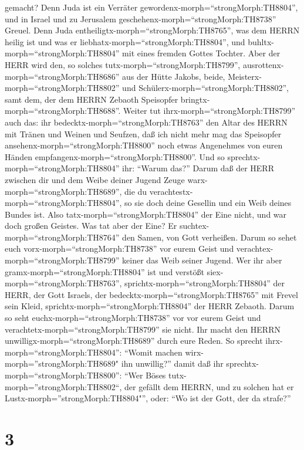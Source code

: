 gemacht?  Denn Juda ist ein Verräter
gewordenx-morph=``strongMorph:TH8804'', und in Israel und zu Jerusalem
geschehenx-morph=``strongMorph:TH8738'' Greuel. Denn Juda
entheiligtx-morph=``strongMorph:TH8765'', was dem HERRN heilig ist und
was er liebhatx-morph=``strongMorph:TH8804'', und
buhltx-morph=``strongMorph:TH8804'' mit eines fremden Gottes Tochter.
 Aber der HERR wird den, so solches
tutx-morph=``strongMorph:TH8799'',
ausrottenx-morph=``strongMorph:TH8686'' aus der Hütte Jakobs, beide,
Meisterx-morph=``strongMorph:TH8802'' und
Schülerx-morph=``strongMorph:TH8802'', samt dem, der dem HERRN Zebaoth
Speisopfer bringtx-morph=``strongMorph:TH8688''.  Weiter
tut ihrx-morph=``strongMorph:TH8799'' auch das: ihr
bedecktx-morph=``strongMorph:TH8763'' den Altar des HERRN mit Tränen und
Weinen und Seufzen, daß ich nicht mehr mag das Speisopfer
ansehenx-morph=``strongMorph:TH8800'' noch etwas Angenehmes von euren
Händen empfangenx-morph=``strongMorph:TH8800''.  Und so
sprechtx-morph=``strongMorph:TH8804'' ihr: ``Warum das?'' Darum daß der
HERR zwischen dir und dem Weibe deiner Jugend Zeuge
warx-morph=``strongMorph:TH8689'', die du
verachtestx-morph=``strongMorph:TH8804'', so sie doch deine Gesellin und
ein Weib deines Bundes ist.  Also
tatx-morph=``strongMorph:TH8804'' der Eine nicht, und war doch großen
Geistes. Was tat aber der Eine? Er suchtex-morph=``strongMorph:TH8764''
den Samen, von Gott verheißen. Darum so sehet euch
vorx-morph=``strongMorph:TH8738'' vor eurem Geist und
verachtex-morph=``strongMorph:TH8799'' keiner das Weib seiner Jugend.
 Wer ihr aber gramx-morph=``strongMorph:TH8804'' ist und
verstößt siex-morph=``strongMorph:TH8763'',
sprichtx-morph=``strongMorph:TH8804'' der HERR, der Gott Israels, der
bedecktx-morph=``strongMorph:TH8765'' mit Frevel sein Kleid,
sprichtx-morph=``strongMorph:TH8804'' der HERR Zebaoth. Darum so seht
euchx-morph=``strongMorph:TH8738'' vor vor eurem Geist und
verachtetx-morph=``strongMorph:TH8799'' sie nicht.  Ihr
macht den HERRN unwilligx-morph=``strongMorph:TH8689'' durch eure Reden.
So sprecht ihrx-morph=``strongMorph:TH8804'': ``Womit machen
wirx-morph=''strongMorph:TH8689" ihn unwillig?'' damit daß ihr
sprechtx-morph=``strongMorph:TH8800'': ``Wer Böses
tutx-morph=''strongMorph:TH8802``, der gefällt dem HERRN, und zu solchen
hat er Lustx-morph=''strongMorph:TH8804"'', oder: ``Wo ist der Gott, der
da strafe?''

\hypertarget{section-2}{%
\section{3}\label{section-2}}


